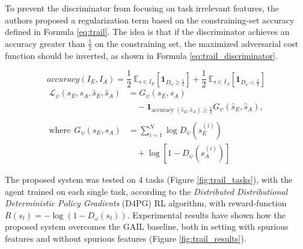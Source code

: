 To prevent the discriminator from focusing on task irrelevant features, the authors proposed a regularization term based on the constraining-set accuracy defined in Formula \ref{eq:trail}. The idea is that if the discriminator achieves an accuracy greater than $\frac{1}{2}$ on the constraining set, the maximized adversarial cost function should be inverted, as shown in Formula \ref{eq:trail_discriminator}.

\begin{equation}
\label{eq:trail}
\textit{accuracy}(I_{E}, I_{A}) = \frac{1}{2} \ \mathbb{E}_{s \in I_{E}} \left[ \mathbf{1}_{D_{\omega} \geq  \frac{1}{2}}\right] + \frac{1}{2} \ \mathbb{E}_{s \in I_{A}} \left[ \mathbf{1}_{D_{\omega} <  \frac{1}{2}}\right] 
\end{equation}
\begin{equation}
    \label{eq:trail_discriminator}
    \begin{aligned}
        \mathcal{L}_\psi\left(s_E, s_A, \hat{s}_E, \hat{s}_A\right) 
        &= G_\psi\left(s_E, s_A\right) \\
        &\quad - \mathbf{1}_{\text {accuracy }\left(\hat{s}_E, \hat{s}_A\right) \geq \frac{1}{2}} G_\psi\left(\hat{s}_E, \hat{s}_A\right), \\ \\
        \text{where} \ \ G_\psi\left(s_E, s_A\right) 
        &= \sum_{i=1}^N \log D_\psi\left(s_E^{(i)}\right) \\
        &\quad + \log \left[1 - D_\psi\left(s_A^{(i)}\right)\right]
    \end{aligned}
\end{equation}

The proposed system was tested on 4 tasks (Figure \ref{fig:trail_tasks}), with the agent trained on each single task, according to the \textit{Distributed Distributional Deterministic Policy Gradients} (D4PG) \cite{barth2018d4pg} RL algorithm, with reward-function $R(s_{t}) = - \log(1-D_{\omega}(s_{t}))$. Experimental results have shown how the proposed system overcomes the GAIL \cite{ho2016gail} baseline, both in setting with spurious features and without spurious features (Figure \ref{fig:trail_results}).



